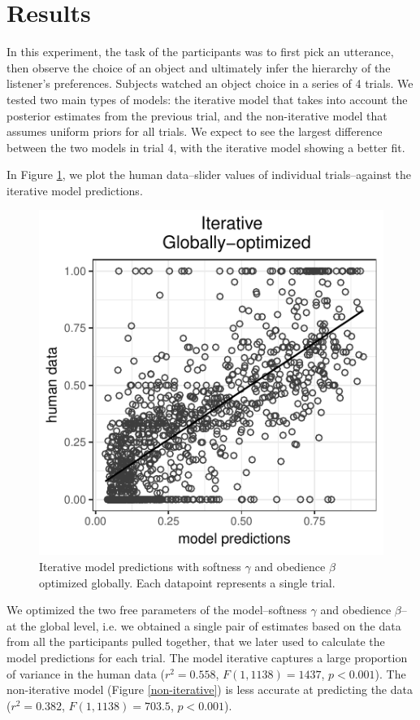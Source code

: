 \documentclass[10pt,a4paper]{article}
\begin{document}
\section{Results}

In this experiment, the task of the participants was to first pick an utterance, then observe the choice of an object and ultimately infer the hierarchy of the listener's preferences. Subjects watched an object choice in a series of 4 trials. We tested two main types of models: the iterative model that takes into account the posterior estimates from the previous trial, and the non-iterative model that assumes uniform priors for all trials. We expect to see the largest difference between the two models in trial 4, with the iterative model showing a better fit.

In Figure \ref{iterative}, we plot the human data--slider values of individual trials--against the iterative model predictions. 

 \begin{figure}
	\centering
	\includegraphics[width=.8\linewidth]{images/m4.pdf}
	\caption{Iterative model predictions with softness $\gamma$ and obedience $\beta$ optimized globally. Each datapoint represents a single trial.}	
	\label{iterative}
\end{figure}


We optimized the two free parameters of the model--softness $\gamma$ and obedience $\beta$--at the global level, i.e. we obtained a single pair of estimates based on the data from all the participants pulled together, that we later used to calculate the model predictions for each trial. The model iterative captures a large proportion of variance in the human data  ($r^2=0.558$, $F(1,1138) = 1437$, $p<0.001$). The non-iterative model (Figure \ref{non-iterative}) is less accurate at predicting the data  ($r^2=0.382$, $F(1,1138) = 703.5$, $p<0.001$).
\end{document}
